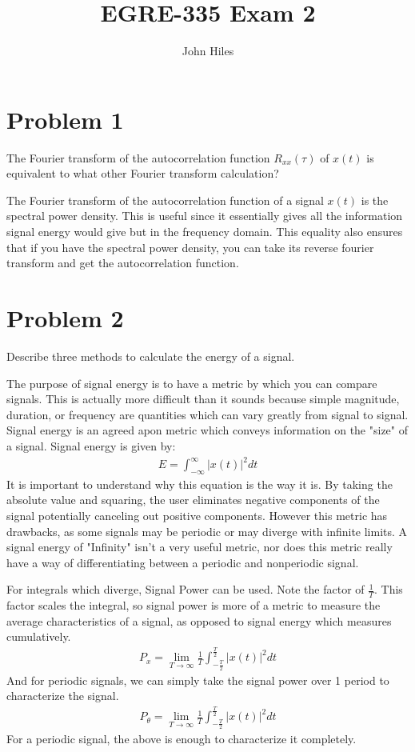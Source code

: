 \documentclass{article}
\title{EGRE-335 Exam 2}
\author{John Hiles}
\begin{document}
\maketitle %


\section*{Problem 1}
The Fourier transform of the autocorrelation function $R_{xx}(\tau)$ of $x(t)$ is equivalent to what other Fourier transform calculation?

The Fourier transform of the autocorrelation function of a signal $x(t)$ is the spectral power density. This is useful since it essentially gives all the information signal energy would give but in the frequency domain. This equality also ensures that if you have the spectral power density, you can take its reverse fourier transform and get the autocorrelation function.

\section*{Problem 2}
Describe three methods to calculate the energy of a signal.

The purpose of signal energy is to have a metric by which you can compare signals. This is actually more difficult than it sounds because simple magnitude, duration, or frequency are quantities which can vary greatly from signal to signal. Signal energy is an agreed apon metric which conveys information on the "size" of a signal. Signal energy is given by:
\begin{align*}
E = \int_{-\infty}^{\infty} |x(t)|^2 dt
\end{align*}
It is important to understand why this equation is the way it is. By taking the absolute value and squaring, the user eliminates negative components of the signal potentially canceling out positive components. However this metric has drawbacks, as some signals may be periodic or may diverge with infinite limits. A signal energy of "Infinity" isn't a very useful metric, nor does this metric really have a way of differentiating between a periodic and nonperiodic signal.

For integrals which diverge, Signal Power can be used. Note the factor of $\frac{1}{T}$. This factor scales the integral, so signal power is more of a metric to measure the average characteristics of a signal, as opposed to signal energy which measures cumulatively.
\begin{align*}
P_x = \lim_{T\rightarrow \infty} \frac{1}{T} \int_{-\frac{T}{2}}^{\frac{T}{2}} |x(t)|^2 dt
\end{align*}
And for periodic signals, we can simply take the signal power over 1 period to characterize the signal.
\begin{align*}
P_\theta = \lim_{T\rightarrow \infty} \frac{1}{T} \int_{-\frac{T}{2}}^{\frac{T}{2}} |x(t)|^2 dt
\end{align*}
For a periodic signal, the above is enough to characterize it completely.
\end{document}
